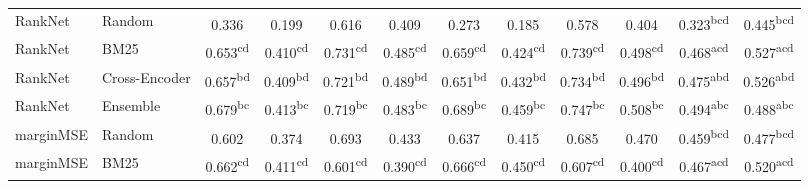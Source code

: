 \begin{table}[t]
\begin{tabular}{llcccccccccc}
  RankNet & Random & 0.336\textsuperscript{\phantom{aaa}} & 0.199\textsuperscript{\phantom{aaa}} & 0.616\textsuperscript{\phantom{aaa}} & 0.409\textsuperscript{\phantom{aaa}} & 0.273\textsuperscript{\phantom{aaa}} & 0.185\textsuperscript{\phantom{aaa}} & 0.578\textsuperscript{\phantom{aaa}} & 0.404\textsuperscript{\phantom{aaa}} & 0.323\textsuperscript{bcd\phantom{}} & 0.445\textsuperscript{bcd\phantom{}} \\
  RankNet & BM25 & 0.653\textsuperscript{cd\phantom{a}} & 0.410\textsuperscript{cd\phantom{a}} & 0.731\textsuperscript{cd\phantom{a}} & 0.485\textsuperscript{cd\phantom{a}} & 0.659\textsuperscript{cd\phantom{a}} & 0.424\textsuperscript{cd\phantom{a}} & 0.739\textsuperscript{cd\phantom{a}} & 0.498\textsuperscript{cd\phantom{a}} & 0.468\textsuperscript{acd\phantom{}} & 0.527\textsuperscript{acd\phantom{}} \\
  RankNet & Cross-Encoder & 0.657\textsuperscript{bd\phantom{a}} & 0.409\textsuperscript{bd\phantom{a}} & 0.721\textsuperscript{bd\phantom{a}} & 0.489\textsuperscript{bd\phantom{a}} & 0.651\textsuperscript{bd\phantom{a}} & 0.432\textsuperscript{bd\phantom{a}} & 0.734\textsuperscript{bd\phantom{a}} & 0.496\textsuperscript{bd\phantom{a}} & 0.475\textsuperscript{abd\phantom{}} & 0.526\textsuperscript{abd\phantom{}} \\
  RankNet & Ensemble & 0.679\textsuperscript{bc\phantom{a}} & 0.413\textsuperscript{bc\phantom{a}} & 0.719\textsuperscript{bc\phantom{a}} & 0.483\textsuperscript{bc\phantom{a}} & 0.689\textsuperscript{bc\phantom{a}} & 0.459\textsuperscript{bc\phantom{a}} & 0.747\textsuperscript{bc\phantom{a}} & 0.508\textsuperscript{bc\phantom{a}} & 0.494\textsuperscript{abc\phantom{}} & 0.488\textsuperscript{abc\phantom{}} \\
  marginMSE & Random & 0.602\textsuperscript{\phantom{aaa}} & 0.374\textsuperscript{\phantom{aaa}} & 0.693\textsuperscript{\phantom{aaa}} & 0.433\textsuperscript{\phantom{aaa}} & 0.637\textsuperscript{\phantom{aaa}} & 0.415\textsuperscript{\phantom{aaa}} & 0.685\textsuperscript{\phantom{aaa}} & 0.470\textsuperscript{\phantom{aaa}} & 0.459\textsuperscript{bcd\phantom{}} & 0.477\textsuperscript{bcd\phantom{}} \\
  marginMSE & BM25 & 0.662\textsuperscript{cd\phantom{a}} & 0.411\textsuperscript{cd\phantom{a}} & 0.601\textsuperscript{cd\phantom{a}} & 0.390\textsuperscript{cd\phantom{a}} & 0.666\textsuperscript{cd\phantom{a}} & 0.450\textsuperscript{cd\phantom{a}} & 0.607\textsuperscript{cd\phantom{a}} & 0.400\textsuperscript{cd\phantom{a}} & 0.467\textsuperscript{acd\phantom{}} & 0.520\textsuperscript{acd\phantom{}} \\

\end{tabular}
\end{table}
